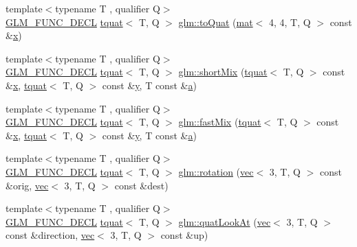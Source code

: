 \begin{DoxyCompactItemize}
\item 
{\footnotesize template$<$typename T , qualifier Q$>$ }\\\hyperlink{setup_8hpp_ab2d052de21a70539923e9bcbf6e83a51}{G\+L\+M\+\_\+\+F\+U\+N\+C\+\_\+\+D\+E\+CL} \hyperlink{structglm_1_1tquat}{tquat}$<$ T, Q $>$ \hyperlink{group__gtx__quaternion_ga6c0a178ac9c7d23e1a6848045d83aa54}{glm\+::to\+Quat} (\hyperlink{structglm_1_1mat}{mat}$<$ 4, 4, T, Q $>$ const \&\hyperlink{_s_d_l__opengl_8h_ad0e63d0edcdbd3d79554076bf309fd47}{x})
\item 
{\footnotesize template$<$typename T , qualifier Q$>$ }\\\hyperlink{setup_8hpp_ab2d052de21a70539923e9bcbf6e83a51}{G\+L\+M\+\_\+\+F\+U\+N\+C\+\_\+\+D\+E\+CL} \hyperlink{structglm_1_1tquat}{tquat}$<$ T, Q $>$ \hyperlink{group__gtx__quaternion_gaf0ad63ac791b1f9a587e363837c2d538}{glm\+::short\+Mix} (\hyperlink{structglm_1_1tquat}{tquat}$<$ T, Q $>$ const \&\hyperlink{_s_d_l__opengl_8h_ad0e63d0edcdbd3d79554076bf309fd47}{x}, \hyperlink{structglm_1_1tquat}{tquat}$<$ T, Q $>$ const \&\hyperlink{_s_d_l__opengl_8h_a1675d9d7bb68e1657ff028643b4037e3}{y}, T const \&\hyperlink{_s_d_l__opengl__glext_8h_a3309789fc188587d666cda5ece79cf82}{a})
\item 
{\footnotesize template$<$typename T , qualifier Q$>$ }\\\hyperlink{setup_8hpp_ab2d052de21a70539923e9bcbf6e83a51}{G\+L\+M\+\_\+\+F\+U\+N\+C\+\_\+\+D\+E\+CL} \hyperlink{structglm_1_1tquat}{tquat}$<$ T, Q $>$ \hyperlink{group__gtx__quaternion_gac5c77bc74dfc750aaf271d68f271bf2b}{glm\+::fast\+Mix} (\hyperlink{structglm_1_1tquat}{tquat}$<$ T, Q $>$ const \&\hyperlink{_s_d_l__opengl_8h_ad0e63d0edcdbd3d79554076bf309fd47}{x}, \hyperlink{structglm_1_1tquat}{tquat}$<$ T, Q $>$ const \&\hyperlink{_s_d_l__opengl_8h_a1675d9d7bb68e1657ff028643b4037e3}{y}, T const \&\hyperlink{_s_d_l__opengl__glext_8h_a3309789fc188587d666cda5ece79cf82}{a})
\item 
{\footnotesize template$<$typename T , qualifier Q$>$ }\\\hyperlink{setup_8hpp_ab2d052de21a70539923e9bcbf6e83a51}{G\+L\+M\+\_\+\+F\+U\+N\+C\+\_\+\+D\+E\+CL} \hyperlink{structglm_1_1tquat}{tquat}$<$ T, Q $>$ \hyperlink{group__gtx__quaternion_ga5a729f33cbd904c9ca14cdf25d0a07e4}{glm\+::rotation} (\hyperlink{structglm_1_1vec}{vec}$<$ 3, T, Q $>$ const \&orig, \hyperlink{structglm_1_1vec}{vec}$<$ 3, T, Q $>$ const \&dest)
\item 
{\footnotesize template$<$typename T , qualifier Q$>$ }\\\hyperlink{setup_8hpp_ab2d052de21a70539923e9bcbf6e83a51}{G\+L\+M\+\_\+\+F\+U\+N\+C\+\_\+\+D\+E\+CL} \hyperlink{structglm_1_1tquat}{tquat}$<$ T, Q $>$ \hyperlink{group__gtx__quaternion_ga668d9ec9964ced2b455d416677e1e8b9}{glm\+::quat\+Look\+At} (\hyperlink{structglm_1_1vec}{vec}$<$ 3, T, Q $>$ const \&direction, \hyperlink{structglm_1_1vec}{vec}$<$ 3, T, Q $>$ const \&up)

\end{DoxyCompactItemize}
